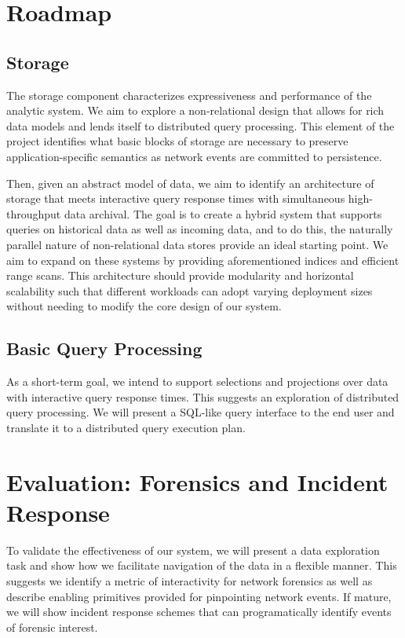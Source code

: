 \documentclass[11pt]{article}
\begin{document}
\section{Roadmap}
\label{sec:road}

\subsection{Storage}
\label{sec:road:storage}

The storage component characterizes expressiveness and performance of the
analytic system. We aim to explore a non-relational design that allows for rich
data models and lends itself to distributed query processing. This element of
the project identifies what basic blocks of storage are necessary to preserve
application-specific semantics as network events are committed to persistence. 

Then, given an abstract model of data, we aim to identify an architecture of storage
that meets interactive query response times with simultaneous high-throughput
data archival. The goal is to create a hybrid system that supports queries on
historical data as well as incoming data, and to do this, the naturally
parallel nature of non-relational data stores provide an ideal starting point.
We aim to expand on these systems by providing aforementioned indices and
efficient range scans. This architecture should provide modularity and horizontal
scalability such that different workloads can adopt varying deployment sizes
without needing to modify the core design of our system.

\subsection{Basic Query Processing}
\label{sec:road:query}

As a short-term goal, we intend to support selections and projections over data
with interactive query response times. This suggests an exploration of
distributed query processing. We will present a SQL-like query interface to the
end user and translate it to a distributed query execution plan.

\section{Evaluation: Forensics and Incident Response}
\label{sec:eval}

To validate the effectiveness of our system, we will present a data exploration
task and show how we facilitate navigation of the data in a flexible manner.
This suggests we identify a metric of interactivity for network forensics as
well as describe enabling primitives provided for pinpointing network events.
If mature, we will show incident response schemes that can programatically
identify events of forensic interest. 
\end{document}
